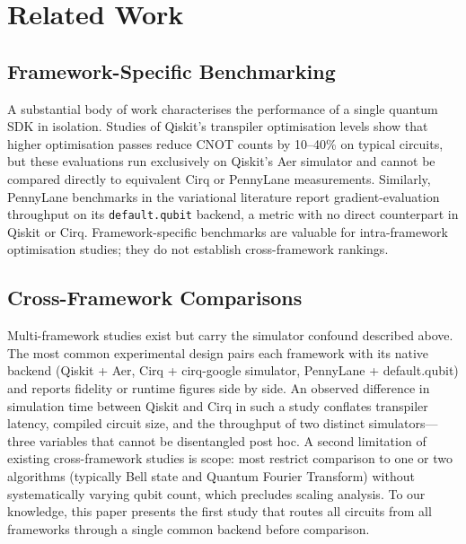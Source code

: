 \section{Related Work}

\subsection{Framework-Specific Benchmarking}
A substantial body of work characterises the performance of a single
quantum SDK in isolation.
Studies of Qiskit's transpiler optimisation levels show that higher
optimisation passes reduce CNOT counts by 10--40\% on typical circuits,
but these evaluations run exclusively on Qiskit's Aer simulator and
cannot be compared directly to equivalent Cirq or PennyLane measurements.
Similarly, PennyLane benchmarks in the variational literature report
gradient-evaluation throughput on its \texttt{default.qubit} backend, a
metric with no direct counterpart in Qiskit or Cirq.
Framework-specific benchmarks are valuable for intra-framework
optimisation studies; they do not establish cross-framework rankings.

\subsection{Cross-Framework Comparisons}
Multi-framework studies exist but carry the simulator confound described
above.
The most common experimental design pairs each framework with its native
backend (Qiskit + Aer, Cirq + cirq-google simulator,
PennyLane + default.qubit) and reports fidelity or runtime figures side
by side.
An observed difference in simulation time between Qiskit and Cirq in
such a study conflates transpiler latency, compiled circuit size, and the
throughput of two distinct simulators---three variables that cannot be
disentangled post hoc.
A second limitation of existing cross-framework studies is scope: most
restrict comparison to one or two algorithms (typically Bell state and
Quantum Fourier Transform) without systematically varying qubit count,
which precludes scaling analysis.
To our knowledge, this paper presents the first study that routes all
circuits from all frameworks through a single common backend before
comparison.

